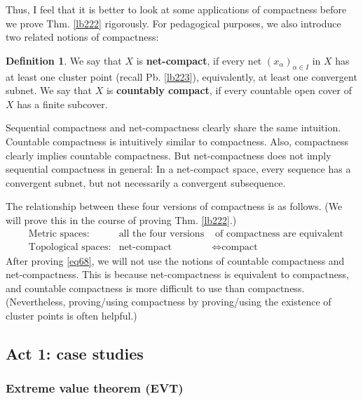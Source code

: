 \documentclass[12pt,b5paper,notitlepage]{article}
\theoremstyle{definition}
\newtheorem{df}{Definition}[section]
\theoremstyle{plain}
\numberwithin{equation}{section}
\begin{document}
Thus, I feel that it is better to look at some applications of compactness before we prove Thm. \ref{lb222} rigorously. For pedagogical purposes, we also introduce two related notions of compactness:

\begin{df}
We say that $X$ is \textbf{net-compact},  if every net $(x_\alpha)_{\alpha\in I}$ in $X$ has at least one cluster point (recall Pb. \ref{lb223}), equivalently, at least one convergent subnet. We say that $X$ is \textbf{countably compact},  if every countable open cover of $X$ has a finite subcover.
\end{df}



Sequential compactness and net-compactness clearly share the same intuition. Countable compactness is intuitively similar to compactness. Also, compactness clearly implies countable compactness. But net-compactness does not imply sequential compactness in general: In a net-compact space, every sequence has a convergent subnet, but not necessarily a convergent subsequence. 

The relationship between these four versions of compactness is as follows. (We will prove this in the course of proving Thm. \ref{lb222}.)
\begin{subequations}\label{eq68}
\begin{align}
&\text{Metric spaces:} & \text{all the four versions}&\text{ of compactness are equivalent}\\
&\text{Topological spaces:} & \text{net-compact}&\Longleftrightarrow\text{compact}
\end{align}
\end{subequations}
After proving \eqref{eq68}, we will not use the notions of countable compactness and net-compactness. This is because net-compactness is equivalent to compactness, and countable compactness is more difficult to use than compactness. (Nevertheless, proving/using compactness by proving/using the existence of cluster points is often helpful.)




\subsection{Act 1: case studies}\label{lb293}



\subsubsection{Extreme value theorem (EVT)}
\end{document}
